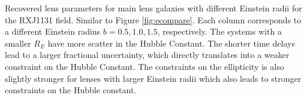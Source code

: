 \label{fig:recompare} Recovered lens parameters for main lens galaxies with different Einstein radii for the RXJ1131 field. Similar to Figure \ref{fig:ecompare}. Each column corresponds to a different Einstein radius $b = 0.5,1.0,1.5$, respectively. The systems with a smaller $R_E$ have more scatter in the Hubble Constant. The shorter time delays lead to a larger fractional uncertainty, which directly translates into a weaker constraint on the Hubble Constant. The constraints on the ellipticity is also slightly stronger for lenses with larger Einstein radii which also leads to stronger constraints on the Hubble constant.